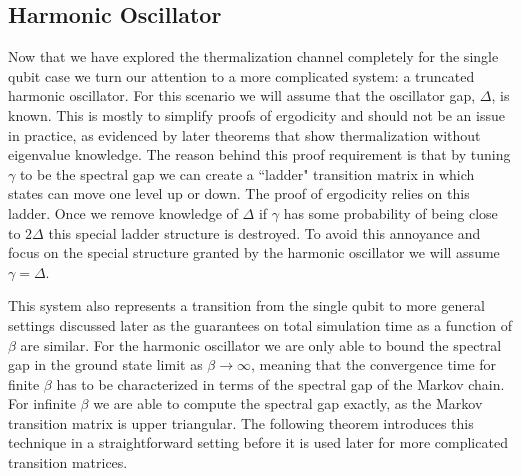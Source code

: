 \documentclass[
 amsmath,amssymb,
 aps,
onecolumn, 
nofootinbib]{revtex4-2}
\begin{document}
\subsection{Harmonic Oscillator} \label{sec:harmonic_oscillator}
Now that we have explored the thermalization channel completely for the single qubit case we turn our attention to a more complicated system: a truncated harmonic oscillator. For this scenario we will assume that the oscillator gap, $\Delta$, is known. This is mostly to simplify proofs of ergodicity and should not be an issue in practice, as evidenced by later theorems that show thermalization without eigenvalue knowledge. The reason behind this proof requirement is that by tuning $\gamma$ to be the spectral gap we can create a ``ladder" transition matrix in which states can move one level up or down. The proof of ergodicity relies on this ladder. Once we remove knowledge of $\Delta$ if $\gamma$ has some probability of being close to $2 \Delta$ this special ladder structure is destroyed. To avoid this annoyance and focus on the special structure granted by the harmonic oscillator we will assume $\gamma = \Delta$.

This system also represents a transition from the single qubit to more general settings discussed later as the guarantees on total simulation time as a function of $\beta$ are similar. For the harmonic oscillator we are only able to bound the spectral gap in the ground state limit as $\beta \to \infty$, meaning that the convergence time for finite $\beta$ has to be characterized in terms of the spectral gap of the Markov chain. For infinite $\beta$ we are able to compute the spectral gap exactly, as the Markov transition matrix is upper triangular. The following theorem introduces this technique in a straightforward setting before it is used later for more complicated transition matrices. 
\end{document}
